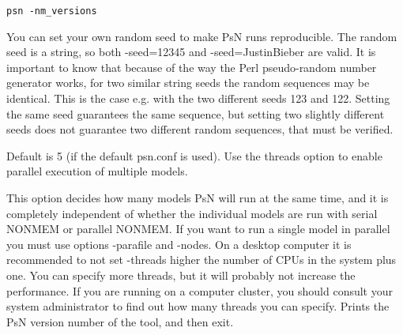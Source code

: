 \begin{optionlist}
\begin{verbatim}
psn -nm_versions
\end{verbatim}
\nextopt
{}
You can set your own random seed to make PsN runs reproducible. The random seed is a string, so both -seed=12345 and -seed=JustinBieber are valid. It is important to know that because of the way the Perl pseudo-random number generator works, for two similar string seeds the random sequences may be identical. This is the case e.g. with the two different seeds 123 and 122. 
Setting the same seed guarantees the same sequence, but setting two slightly different seeds does not guarantee two different random sequences, that must be verified.
\nextopt


Default is 5 (if the default psn.conf is used). Use the threads option to enable parallel execution of multiple models.

This option decides how many models PsN will run at the same time, and it is completely independent of whether the individual models are run with serial NONMEM or parallel NONMEM. If you want to run a single model in parallel you must use options -parafile and -nodes. On a desktop computer it is recommended to not set -threads higher the number of CPUs in the system plus one. 
You can specify more threads, but it will probably not increase the performance. If you are running on a computer cluster, you should consult your system administrator to find out how many threads you can specify. 
\nextopt
{}
Prints the PsN version number of the tool, and then exit. 
\nextopt
\end{optionlist}
